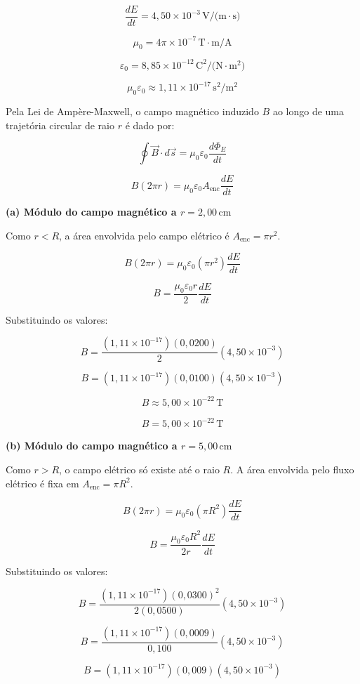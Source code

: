 \documentclass[12pt,a4paper]{article}
\begin{document}
\[
\frac{dE}{dt} = 4,50 \times 10^{-3}\,\text{V/(m}\cdot\text{s)}
\]

\[
\mu_0 = 4\pi \times 10^{-7}\,\text{T}\cdot\text{m/A}
\]

\[
\varepsilon_0 = 8,85 \times 10^{-12}\,\text{C}^2/\text{(N}\cdot\text{m}^2)
\]

\[
\mu_0\varepsilon_0 \approx 1,11 \times 10^{-17}\,\text{s}^2/\text{m}^2
\]

Pela Lei de Ampère-Maxwell, o campo magnético induzido \(B\) ao longo de uma trajetória circular de raio \(r\) é dado por:

\[
\oint \vec{B} \cdot d\vec{s} = \mu_0 \varepsilon_0 \frac{d\Phi_E}{dt}
\]

\[
B(2\pi r) = \mu_0 \varepsilon_0 A_{\text{enc}} \frac{dE}{dt}
\]

\textbf{(a) Módulo do campo magnético a \(r = 2,00\,\text{cm}\)}

Como \(r < R\), a área envolvida pelo campo elétrico é \(A_{\text{enc}} = \pi r^2\).

\[
B(2\pi r) = \mu_0 \varepsilon_0 (\pi r^2) \frac{dE}{dt}
\]

\[
B = \frac{\mu_0 \varepsilon_0 r}{2} \frac{dE}{dt}
\]

Substituindo os valores:

\[
B = \frac{(1,11 \times 10^{-17})(0,0200)}{2} (4,50 \times 10^{-3})
\]

\[
B = (1,11 \times 10^{-17})(0,0100)(4,50 \times 10^{-3})
\]

\[
B \approx 5,00 \times 10^{-22}\,\text{T}
\]

\[
\boxed{B = 5,00 \times 10^{-22}\,\text{T}}
\]

\textbf{(b) Módulo do campo magnético a \(r = 5,00\,\text{cm}\)}

Como \(r > R\), o campo elétrico só existe até o raio \(R\). A área envolvida pelo fluxo elétrico é fixa em \(A_{\text{enc}} = \pi R^2\).

\[
B(2\pi r) = \mu_0 \varepsilon_0 (\pi R^2) \frac{dE}{dt}
\]

\[
B = \frac{\mu_0 \varepsilon_0 R^2}{2r} \frac{dE}{dt}
\]

Substituindo os valores:

\[
B = \frac{(1,11 \times 10^{-17})(0,0300)^2}{2(0,0500)} (4,50 \times 10^{-3})
\]

\[
B = \frac{(1,11 \times 10^{-17})(0,0009)}{0,100} (4,50 \times 10^{-3})
\]

\[
B = (1,11 \times 10^{-17})(0,009)(4,50 \times 10^{-3})
\]
\end{document}
